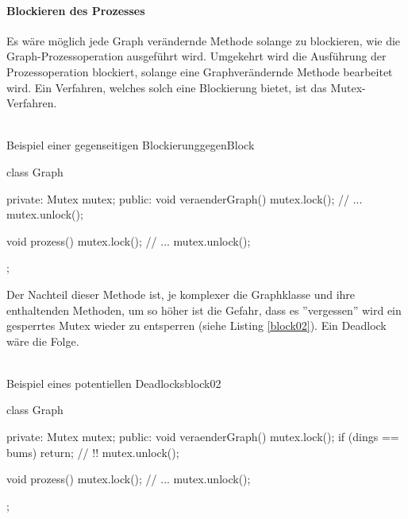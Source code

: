 \paragraph{Blockieren des Prozesses}
Es wäre möglich jede Graph verändernde Methode solange zu blockieren, wie die Graph-Prozessoperation ausgeführt wird. Umgekehrt wird die Ausführung der Prozessoperation blockiert, solange eine Graphverändernde Methode bearbeitet wird. Ein Verfahren, welches solch eine Blockierung bietet, ist das Mutex-Verfahren.
\\\\
\begin{code}{Beispiel einer gegenseitigen Blockierung}{gegenBlock}
	
class Graph {
private:
	Mutex mutex;
public:
	void veraenderGraph() {
		mutex.lock();
		// ...
		mutex.unlock();
	}
	
	void prozess() {
		mutex.lock();
		// ...
		mutex.unlock();
	} 
};	
		
\end{code}
\NP
Der Nachteil dieser Methode ist, je komplexer die Graphklasse und ihre enthaltenden Methoden, um so höher ist die Gefahr, dass es ''vergessen'' wird ein gesperrtes Mutex wieder zu entsperren (siehe Listing \ref{block02}). Ein Deadlock wäre die Folge.
\\\\
\begin{code}{Beispiel eines potentiellen Deadlocks}{block02}
	
class Graph {
private:
	Mutex mutex;
public:
	void veraenderGraph() {
		mutex.lock();
		if (dings == bums) {
			return;	// !!
		}
		mutex.unlock();
	}
	
	void prozess() {
		mutex.lock();
		// ...
		mutex.unlock();
	} 
};	
		
\end{code} 
